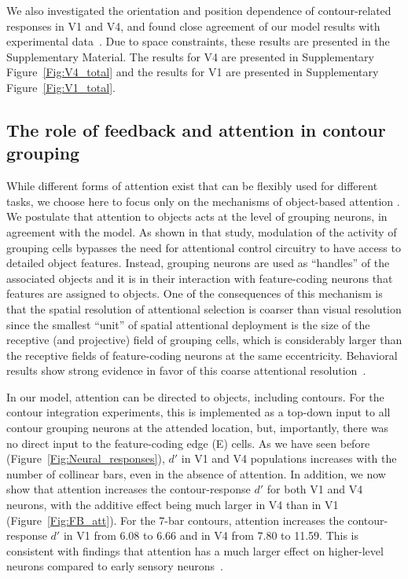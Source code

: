 We also investigated the orientation and position dependence of
contour-related responses in V1 and V4, and found close agreement of
our model results with experimental data~\citep{Chen_etal14}. Due
to space constraints, these results are presented in the Supplementary
Material. The results for V4 are presented in Supplementary Figure~\ref{Fig:V4_total} and the results for V1 are presented in Supplementary Figure~\ref{Fig:V1_total}.

\subsection{The role of feedback and attention in contour grouping}   
\label{sec:feedback}
While different forms of attention exist that can be flexibly used for
different tasks, we choose here to focus only on the mechanisms of
object-based attention
\citep{Egly_etal94,Scholl01,Kimchi_etal07,Ho_Yeh09}.  We postulate
that attention to objects acts at the level of grouping neurons, in
agreement with the \cite{Mihalas_etal11b} model.  As shown in that
study, modulation of the activity of grouping cells bypasses the need
for attentional control circuitry to have access to detailed object
features.  Instead, grouping neurons are used as ``handles'' of the
associated objects and it is in their interaction with feature-coding
neurons that features are assigned to objects. One of the consequences
of this mechanism is that the spatial resolution of attentional
selection is coarser than visual resolution since the smallest
``unit'' of spatial attentional deployment is the size of the
receptive (and projective) field of grouping cells, which is
considerably larger than the receptive fields of feature-coding
neurons at the same eccentricity. Behavioral results show strong
evidence in favor of this coarse attentional
resolution~\citep{Intriligator_Cavanagh01}.

In our model, attention can be directed to objects, including
contours. For the contour integration experiments, this is implemented
as a top-down input to all contour grouping neurons 
at the attended location, but, importantly, 
there was
%
no direct input to the feature-coding edge (E) cells.
As we have seen before (Figure~\ref{Fig:Neural_responses}), $d'$ in V1
and V4 populations increases with the number of collinear bars, even
in the absence of attention.  In addition, we now show that attention
increases the contour-response $d'$ for both V1 and V4 neurons, with
the additive effect being much larger in V4 than in V1
(Figure~\ref{Fig:FB_att}). For the 7-bar contours, attention increases
the contour-response $d'$ in V1 from 6.08 to 6.66 and in V4 from 7.80
to 11.59. This is consistent with findings that attention has a much
larger effect on higher-level neurons compared to early sensory
neurons~\citep[review:][]{Treue01}.

